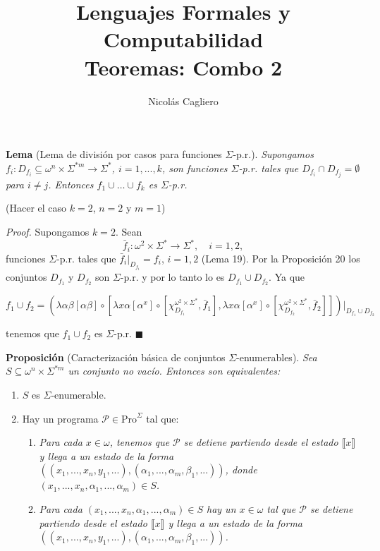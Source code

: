 \documentclass{article}
\title{Lenguajes Formales y Computabilidad \\
        \large Teoremas: Combo 2 }
\author{Nicolás Cagliero}
\begin{document}
\maketitle

\textbf{Lema} (Lema de división por casos para funciones $\Sigma$-p.r.). 
\textit{Supongamos $f_i : D_{f_i} \subseteq \omega^n \times \Sigma^{*m} \to \Sigma^*$, $i = 1, ..., k$, son funciones $\Sigma$-p.r. tales que 
$D_{f_i} \cap D_{f_j} = \emptyset$ para $i \ne j$. Entonces $f_1 \cup \ldots \cup f_k$ es $\Sigma$-p.r.}

\medskip

(Hacer el caso $k = 2$, $n = 2$ y $m = 1$)

\medskip

\textit{Proof.} Supongamos $k = 2$. Sean
\[
\bar{f}_i : \omega^2 \times \Sigma^{*} \to \Sigma^*, \quad i = 1, 2,
\]
funciones $\Sigma$-p.r. tales que $\bar{f}_i|_{D_{f_i}} = f_i$, $i = 1, 2$ (Lema 19). Por la Proposición 20 los conjuntos $D_{f_1}$ y $D_{f_2}$ son $\Sigma$-p.r. y por lo tanto lo es $D_{f_1} \cup D_{f_2}$. Ya que

\[
f_1 \cup f_2 =
\left( \lambda \alpha \beta \left[ \alpha \beta \right] \circ 
\left[ \lambda x \alpha \left[ \alpha^x \right] \circ 
\left[ \chi_{D_{f_1}}^{\omega^2 \times \Sigma^{*}}, \bar{f}_1 \right], 
\lambda x \alpha \left[ \alpha^x \right] \circ 
\left[ \chi_{D_{f_2}}^{\omega^2 \times \Sigma^{*}}, \bar{f}_2 \right] \right] 
\right) \Big|_{D_{f_1} \cup D_{f_2}}
\]

tenemos que $f_1 \cup f_2$ es $\Sigma$-p.r. \hfill $\blacksquare$

\bigskip

\textbf{Proposición} (Caracterización básica de conjuntos $\Sigma$-enumerables). 
\textit{Sea $S \subseteq \omega^n \times \Sigma^{*m}$ un conjunto no vacío. Entonces son equivalentes:}

\begin{enumerate}
    \item $S$ es $\Sigma$-enumerable.
    \item Hay un programa $\mathcal{P} \in \text{Pro}^{\Sigma}$ tal que:
    \begin{enumerate}
        \item \textit{Para cada $x \in \omega$, tenemos que $\mathcal{P}$ se detiene partiendo desde el estado 
        $\llbracket x \rrbracket$ y llega a un estado de la forma $((x_1, ..., x_n, y_1, ...), (\alpha_1, ..., \alpha_m, \beta_1, ...))$, 
        donde $(x_1, ..., x_n, \alpha_1, ..., \alpha_m) \in S$.}
        
        \item \textit{Para cada $(x_1, ..., x_n, \alpha_1, ..., \alpha_m) \in S$ hay un $x \in \omega$ tal que $\mathcal{P}$ 
        se detiene partiendo desde el estado $\llbracket x \rrbracket$ y llega a un estado de la forma 
        $((x_1, ..., x_n, y_1, ...), (\alpha_1, ..., \alpha_m, \beta_1, ...))$.}
    \end{enumerate}
\end{enumerate}
\end{document}
